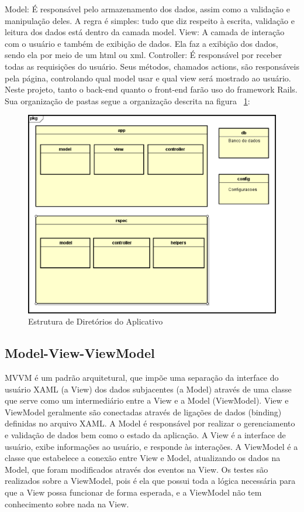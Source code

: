 Model: É responsável pelo armazenamento dos dados, assim como a  validação e manipulação deles. A regra é simples: tudo que diz respeito à escrita, validação e leitura dos dados está dentro da camada model.
View: A camada de interação com o usuário e também de exibição de dados. Ela faz a  exibição dos dados, sendo ela por meio de um html ou xml.
Controller: É responsável por receber todas as requisições do usuário. Seus métodos, chamados actions, são responsáveis pela página, controlando qual model usar e qual view será mostrado ao usuário.
Neste projeto, tanto o back-end quanto o front-end farão uso do framework Rails. Sua organização de pastas segue a organização descrita na figura ~\ref{fig:pastas}:

\begin{figure}[!ht]
  \centering
  \includegraphics[keepaspectratio=true,scale=0.4]{figuras/pastas.eps}
  \caption{Estrutura de Diretórios do Aplicativo}
  \label{fig:pastas}
\end{figure}

\subsection{Model-View-ViewModel}

MVVM é um padrão arquitetural, que impõe uma separação da interface do usuário XAML (a View) dos dados subjacentes (a Model) através de uma classe que serve como um intermediário entre a View e a Model (ViewModel). View e ViewModel geralmente são conectadas através de ligações de dados (binding) definidas no arquivo XAML.
A Model é responsável por realizar o gerenciamento e validação de dados bem como o estado da aplicação.
A View é a interface de usuário, exibe informações ao usuário, e responde às interações.
A ViewModel é a classe que estabelece a conexão entre View e Model, atualizando os dados na Model, que foram modificados através dos eventos na View.
Os testes são realizados sobre a ViewModel, pois é ela que possui toda a lógica necessária para que a View possa funcionar de forma esperada, e a ViewModel não tem conhecimento sobre nada na View.

